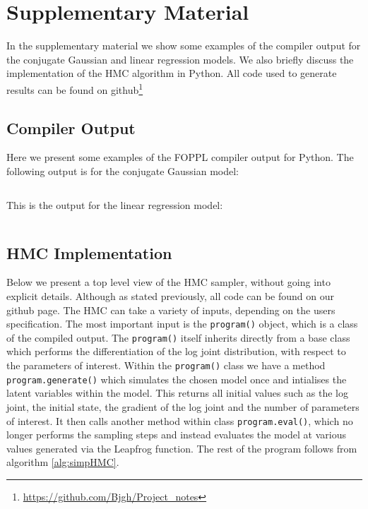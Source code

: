 \section{Supplementary Material}
\label{sec:supmat}

In the supplementary material we show some examples of the compiler output for the conjugate Gaussian and linear regression models. We also briefly discuss the implementation of the HMC algorithm in Python.  All code used to generate results can be found on github\footnote{\url{https://github.com/Bjgh/Project_notes}}\\

\subsection{Compiler Output}
Here we present some examples of the FOPPL compiler output for Python. 
The following output is for the conjugate Gaussian model:  
\inputminted{python}{code/cjgauss.py}
This is the output for the linear regression model:
\inputminted{python}{code/lr_out.py}

\subsection{HMC Implementation}

Below we present a top level view of the HMC sampler, without going into explicit details. Although as stated previously, all code can be found on our github page. The HMC can take a variety of inputs, depending on the users specification. The most important input is the \texttt{program()} object, which is a class of the compiled output. The \texttt{program()} itself inherits directly from a base class which performs the differentiation of the log joint distribution, with respect to the parameters of interest. Within the \texttt{program()} class we have a method \texttt{program.generate()} which simulates the chosen model once and intialises the latent variables within the model. This returns all initial values such as the log joint, the initial state, the gradient of the log joint and the number of parameters of interest. It then calls another method within class \texttt{program.eval()}, which no longer performs the sampling steps and instead evaluates the model at various values generated via the Leapfrog function. The rest of the program follows from algorithm \ref{alg:simpHMC}.
 
